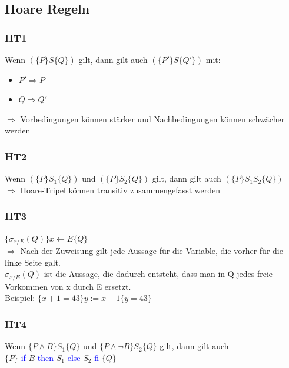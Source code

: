 \documentclass[a4paper,portrait]{scrartcl}
\begin{document}
\subsection{Hoare Regeln}
\subsubsection{HT1}
Wenn $ (\lbrace P \rbrace S \lbrace Q \rbrace )$ gilt, dann gilt auch $ (\lbrace P' \rbrace S \lbrace Q' \rbrace )$ mit:
\begin{itemize}
\item $ P' \Rightarrow P $
\item $ Q \Rightarrow Q' $
\end{itemize}
$\Rightarrow$ Vorbedingungen können stärker und Nachbedingungen können schwächer werden
\subsubsection{HT2}
Wenn $ (\lbrace P \rbrace S_{1} \lbrace Q \rbrace )$ und $ (\lbrace P \rbrace S_{2} \lbrace Q \rbrace )$ gilt, dann gilt auch $ (\lbrace P \rbrace S_{1}S_{2} \lbrace Q \rbrace )$\\
$\Rightarrow$ Hoare-Tripel können transitiv zusammengefasst werden
\subsubsection{HT3}
$\lbrace \sigma_{x/E}(Q) \rbrace x \leftarrow E \lbrace Q \rbrace$ \\
$\Rightarrow$ Nach der Zuweisung gilt jede Aussage für die Variable, die vorher für die linke Seite galt. \\
$\sigma_{x/E}(Q)$ ist die Aussage, die dadurch entsteht, dass man in Q jedes freie Vorkommen von x durch E ersetzt. \\
Beispiel: $\lbrace x+1=43 \rbrace y := x+1 \lbrace y = 43 \rbrace$
\subsubsection{HT4}
Wenn $ \lbrace P \wedge B \rbrace S_{1} \lbrace Q \rbrace $ und $ \lbrace P \wedge \neg B \rbrace S_{2} \lbrace Q \rbrace $ gilt, dann gilt auch \\
$ \lbrace P \rbrace$ \textcolor{blue}{if} $B$ \textcolor{blue}{then} $S_{1}$ \textcolor{blue}{else} $S_{2}$ \textcolor{blue}{fi} $\lbrace Q \rbrace$
\end{document}
